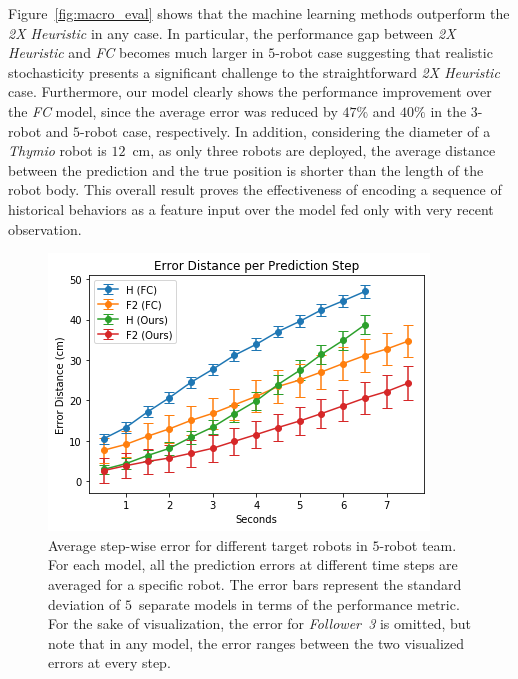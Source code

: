 \documentclass[letterpaper, 10 pt, conference]{ieeeconf}  %
\begin{document}
    Figure~\ref{fig:macro_eval} shows that the machine learning methods
    outperform the \emph{2X Heuristic} in any case. In particular, the
    performance gap between \emph{2X Heuristic} and \emph{FC} becomes
    much larger in $5$-robot case suggesting that realistic
    stochasticity presents a significant challenge to the
    straightforward \emph{2X Heuristic} case. Furthermore, our model
    clearly shows the performance improvement over the \emph{FC} model,
    since the average error was reduced by $47\%$ and $40\%$ in the
    $3$-robot and $5$-robot case, respectively. In addition, considering
    the diameter of a \emph{Thymio} robot is $12$~cm, as only three
    robots are deployed, the average distance between the prediction and
    the true position is shorter than the length of the robot body. This
    overall result proves the effectiveness of encoding a sequence of
    historical behaviors as a feature input over the model fed only with
    very recent observation.
    \begin{figure}[t]
    	\centering
    	\includegraphics[width=1.\columnwidth]{fig_micro_eval}
    	\caption{Average step-wise error for different target robots in $5$-robot team.
    		For each model, all the prediction errors at different time steps are averaged
    		for a specific robot. The error bars represent the standard deviation of
    		$5$~separate models in terms of the performance metric. For the sake of
    		visualization, the error for \emph{Follower~3} is omitted, but note that
    		in any model, the error ranges between the two visualized errors at every step.
    	}
    	\label{fig:micro_eval}
    \end{figure}
\end{document}
